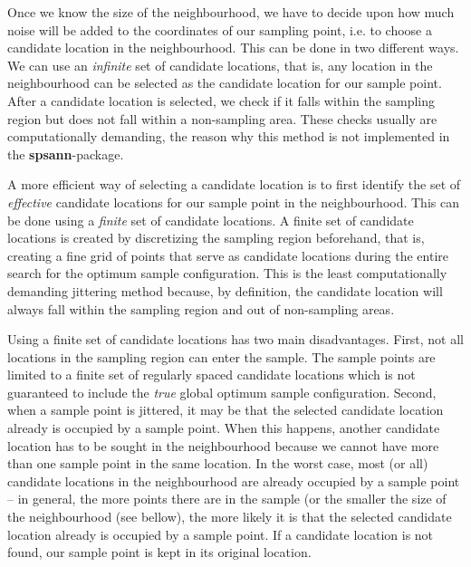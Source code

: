 Once we know the size of the neighbourhood, we have to decide upon how much 
noise will be added to the coordinates of our sampling point, i.e. to choose a
candidate location in the neighbourhood. This can be done in two different ways.
We can use an \textit{infinite} set of candidate locations, that is, any 
location in the neighbourhood can be selected as the candidate location for our 
sample point. After a candidate location is selected, we check if it falls 
within the sampling region but does not fall within a non-sampling area. These 
checks usually are computationally demanding, the reason why this method is not 
implemented in the \textbf{spsann}-package.

A more efficient way of selecting a candidate location is to first identify the
set of \textit{effective} candidate locations for our sample point in the 
neighbourhood. This can be done using a \textit{finite} set of candidate 
locations. A finite set of candidate locations is created by discretizing the 
sampling region beforehand, that is, creating a fine grid of points that serve 
as candidate locations during the entire search for the optimum sample 
configuration. This is the least computationally demanding jittering method 
because, by definition, the candidate location will always fall within the 
sampling region and out of non-sampling areas.

Using a finite set of candidate locations has two main disadvantages. First, not
all locations in the sampling region can enter the sample. The sample points are
limited to a finite set of regularly spaced candidate locations which is not 
guaranteed to include the \textit{true} global optimum sample configuration. 
Second, when a sample point is jittered, it may be that the selected candidate 
location already is occupied by a sample point. When this happens, another 
candidate location has to be sought in the neighbourhood because we cannot have 
more than one sample point in the same location. In the worst case, most (or 
all) candidate locations in the neighbourhood are already occupied by a sample 
point -- in general, the more points there are in the sample (or the smaller 
the size of the neighbourhood (see bellow), the more likely it is that the 
selected candidate location already is occupied by a sample point. If a 
candidate location is not found, our sample point is kept in its original 
location.


